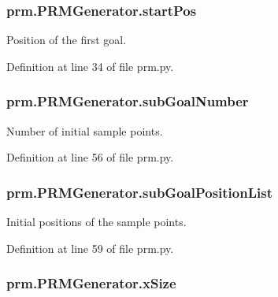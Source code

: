\hypertarget{classprm_1_1PRMGenerator_a784ce423bc47ebc7a09632948eb903eb}{
\subsubsection[{start\-Pos}]{\setlength{\rightskip}{0pt plus 5cm}prm.\-P\-R\-M\-Generator.\-start\-Pos}}\label{classprm_1_1PRMGenerator_a784ce423bc47ebc7a09632948eb903eb}


Position of the first goal. 



Definition at line 34 of file prm.\-py.

\hypertarget{classprm_1_1PRMGenerator_af8d162e83184c5493019e868e53fcefd}{
\subsubsection[{sub\-Goal\-Number}]{\setlength{\rightskip}{0pt plus 5cm}prm.\-P\-R\-M\-Generator.\-sub\-Goal\-Number}}\label{classprm_1_1PRMGenerator_af8d162e83184c5493019e868e53fcefd}


Number of initial sample points. 



Definition at line 56 of file prm.\-py.

\hypertarget{classprm_1_1PRMGenerator_a6c5a8c95cfb4636e37404d2f2dce78f8}{
\subsubsection[{sub\-Goal\-Position\-List}]{\setlength{\rightskip}{0pt plus 5cm}prm.\-P\-R\-M\-Generator.\-sub\-Goal\-Position\-List}}\label{classprm_1_1PRMGenerator_a6c5a8c95cfb4636e37404d2f2dce78f8}


Initial positions of the sample points. 



Definition at line 59 of file prm.\-py.

\hypertarget{classprm_1_1PRMGenerator_a0cf38de489be01fc5ed01c1a59da8f0b}{
\subsubsection[{x\-Size}]{\setlength{\rightskip}{0pt plus 5cm}prm.\-P\-R\-M\-Generator.\-x\-Size}}\label{classprm_1_1PRMGenerator_a0cf38de489be01fc5ed01c1a59da8f0b}


